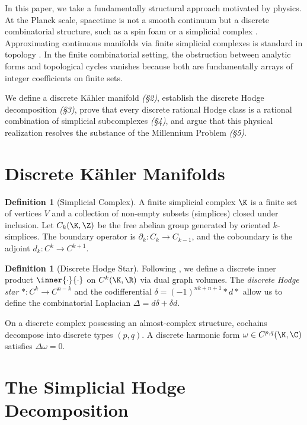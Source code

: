 \documentclass[12pt, a4paper]{article}
\theoremstyle{plain}
\theoremstyle{definition}
\newtheorem{definition}[theorem]{Definition}
\begin{document}
In this paper, we take a fundamentally structural approach motivated by physics.
At the Planck scale, spacetime is not a smooth continuum but a discrete
combinatorial structure, such as a spin foam or a simplicial complex \citep{Rovelli2004, Baez1998}.
Approximating continuous manifolds via finite simplicial complexes is standard
in topology \citep{Eckmann1945, Dodziuk1976}. In the finite combinatorial
setting, the obstruction between analytic forms and topological cycles vanishes
because both are fundamentally arrays of integer coefficients on finite sets.

We define a discrete K\"ahler manifold \emph{(\S 2)}, establish the discrete
Hodge decomposition \emph{(\S 3)}, prove that every discrete rational Hodge
class is a rational combination of simplicial subcomplexes \emph{(\S 4)}, and
argue that this physical realization resolves the substance of the Millennium
Problem \emph{(\S 5)}.

\section{Discrete K\"ahler Manifolds}

\begin{definition}[Simplicial Complex]
A finite simplicial complex $\K$ is a finite set of vertices $V$ and a collection of
non-empty subsets (simplices) closed under inclusion. Let $C_k(\K, \Z)$ be the free
abelian group generated by oriented $k$-simplices. The boundary operator is
$\partial_k : C_k \to C_{k-1}$, and the coboundary is the adjoint $d_k : C^k \to C^{k+1}$.
\end{definition}

\begin{definition}[Discrete Hodge Star]
Following \citet{Desbrun2005}, we define a discrete inner product $\inner{\cdot}{\cdot}$
on $C^k(\K, \R)$ via dual graph volumes. The \emph{discrete Hodge star} $*: C^k \to C^{n-k}$
and the codifferential $\delta = (-1)^{nk+n+1} * d *$ allow us to define the combinatorial
Laplacian $\Delta = d\delta + \delta d$.
\end{definition}

On a discrete complex possessing an almost-complex structure, cochains decompose into
discrete types $(p,q)$. A discrete harmonic form $\omega \in C^{p,q}(\K, \C)$
satisfies $\Delta \omega = 0$.

\section{The Simplicial Hodge Decomposition}
\end{document}
